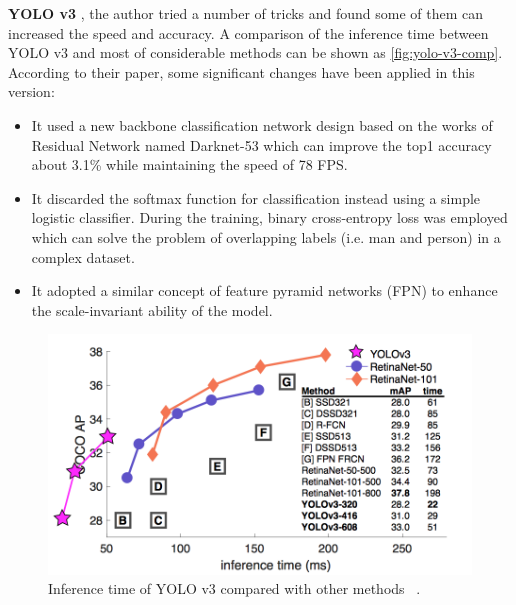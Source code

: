 \textbf{YOLO v3} \cite{yolov3-paper-2018}, the author tried a number of tricks 
and found some of them can increased the speed and accuracy.
A comparison of the inference time between YOLO v3 and most of considerable 
methods can be shown as \autoref{fig:yolo-v3-comp}.
According to their paper, some significant changes have been applied in this
version:

\begin{itemize}
    \item It used a new backbone classification network design based on the
    works of Residual Network \cite{resnet-paper1-2015}
    \cite{resnet-paper2-2016} named Darknet-53 which can improve the top1
    accuracy about 3.1\% while maintaining the speed of 78 FPS.

    \item It discarded the softmax function for classification instead using a 
    simple logistic classifier. 
    During the training, binary cross-entropy loss was
    employed which can solve the problem of overlapping labels (i.e. man and
    person) in a complex dataset.

    \item It adopted a similar concept of feature pyramid networks (FPN) to
    enhance the scale-invariant ability of the model.
\end{itemize}

\begin{figure}
    \begin{center}
        \includegraphics[scale=0.7]{figures/yolov3_comp.png}
    \end{center}
    \caption{Inference time of YOLO v3 compared with other methods
        ~\protect\cite{focal-loss-for-dense-od}.}
    \label{fig:yolo-v3-comp}
\end{figure}

